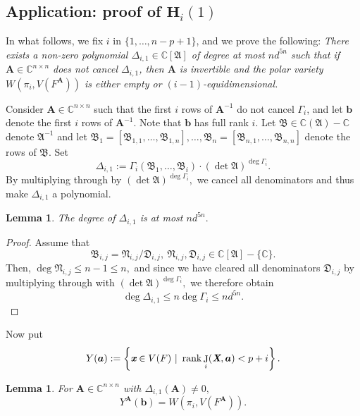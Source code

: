 \documentclass[a4paper]{article}
\def\fB{{\mathfrak B}}
\def\fN{{\mathfrak N}}
\def\fD{{\mathfrak D}}
\def\A{\mathfrak{A}}
\def\Xb{\textit{\textbf{X}}}
\def\mA{{\bm A}}
\def\xb{\textit{\textbf{x}}}
\def\D{\Delta}
\DeclareMathOperator{\J}{J}
\DeclareMathOperator{\rk}{rank}
\def\C{\mathbb{C}}
\def\WiA{W(\pi_i,V(F^{\mA}))}
\def\gi{\Gamma_i}
\newtheorem{lemma}[theorem]{Lemma}
\begin{document}
   
    \subsection{Application: proof of $\textbf{H}_i(1)$}\label{Gi1}
In what follows, we fix $i$ in $\{1,\dots,n-p+1\}$, and
    we prove the following: {\em There exists a non-zero polynomial
    $\D_{i,1} \in \C[\A]$ of degree at most $nd^{5n}$ such that if $\mA
    \in \C^{n\times n}$ does not cancel $\D_{i,1}$, then $\mA$ is
    invertible and the polar variety $\WiA$ is either empty or $(i-1)$-equidimensional.}
    
    Consider $\bm A \in \C^{n \times n}$ such that the first $i$ rows of $\bm A^{-1}$ do not cancel $\gi$, and let $\bm b$ denote the first $i$ rows of $\bm A^{-1}$. Note that $\bm b$ has full rank $i$. Let $\fB \in \C(\A)-\C$ denote $\A^{-1}$ and let $\fB_1=[\fB_{1,1},\hdots,\fB_{1,n}],\hdots,\fB_n=[\fB_{n,1},\hdots,\fB_{n,n}]$ denote the rows of $\fB.$ Set  
    \[
    \Delta_{i,1} := \Gamma_i(\fB_1,\hdots,\fB_i)\cdot (\det \A)^{\deg \gi}. 
    \]
    By multiplying through by $(\det \A)^{\deg \gi},$ we cancel all denominators and thus make $\D_{i,1}$ a polynomial. 
    \begin{lemma}
    The degree of $\Delta_{i,1}$ is at most $nd^{5n}.$
    \end{lemma}
    \begin{proof}
        Assume that 
        \[
        \fB_{i,j}=\fN_{i,j}/\fD_{i,j},~ \fN_{i,j},\fD_{i,j} \in \C[\A]-\{\C\}.
        \]
        Then, $\deg \fN_{i,j} \leq n-1 \leq n,$ and since we have cleared all denominators $\fD_{i,j}$ by multiplying through with $(\det \A)^{\deg \gi},$ we therefore obtain 
        \[
        \deg \Delta_{i,1} \leq n\deg \gi \leq nd^{5n}.
        \]
    \end{proof}
    \noindent
    Now put 
    \[
    Y(\bm a) := \left\{\xb \in V(F)~|~\rk \J_i(\Xb,\bm a) < p+i\right\}.
    \]
    \begin{lemma}
    For $\mA \in \C^{n \times n}$ with $\Delta_{i,1}(\mA) \not = 0,$ 
    \[
    Y^{\mA}(\bm b) = W\left(\pi_i,V\left(F^{\mA}\right)\right).
    \]
    \end{lemma}
\end{document}
